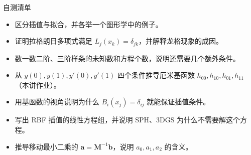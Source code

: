 \documentclass[a4paper]{article}
\begin{document}
\begin{practicebox}{自测清单}
\begin{itemize}
\item 区分插值与拟合，并各举一个图形学中的例子。
\item 证明拉格朗日多项式满足 $L_j(x_k)=\delta_{jk}$，并解释龙格现象的成因。
\item 数一数二阶、三阶样条的未知数和方程个数，说明还需要几个额外条件。
\item 从 $y(0),y(1),y'(0),y'(1)$ 四个条件推导厄米基函数 $h_{00},h_{10},h_{01},h_{11}$（本讲作业）。
\item 用基函数的视角说明为什么 $B_i(x_j)=\delta_{ij}$ 就能保证插值条件。
\item 写出 RBF 插值的线性方程组，并说明 SPH、3DGS 为什么不需要解这个方程。
\item 推导移动最小二乘的 $\mathbf a=\mathbf M^{-1}\mathbf b$，说明 $a_0,a_1,a_2$ 的含义。
\end{itemize}
\end{practicebox}
\end{document}
